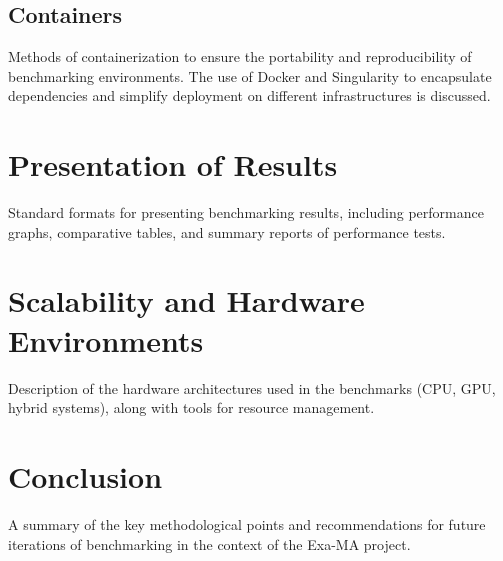 \subsection{Containers}
\label{sec:methodology-packaging-container}

Methods of containerization to ensure the portability and reproducibility of benchmarking environments.
The use of Docker and Singularity to encapsulate dependencies and simplify deployment on different infrastructures is discussed.

\section{Presentation of Results}
\label{sec:methodology-presentation}
Standard formats for presenting benchmarking results, including performance graphs, comparative tables, and summary reports of performance tests.

\section{Scalability and Hardware Environments}
\label{sec:methodology-environments}
Description of the hardware architectures used in the benchmarks (CPU, GPU, hybrid systems), along with tools for resource management.

\section{Conclusion}
\label{sec:methodology-conclusion}

A summary of the key methodological points and recommendations for future iterations of benchmarking in the context of the Exa-MA project.





